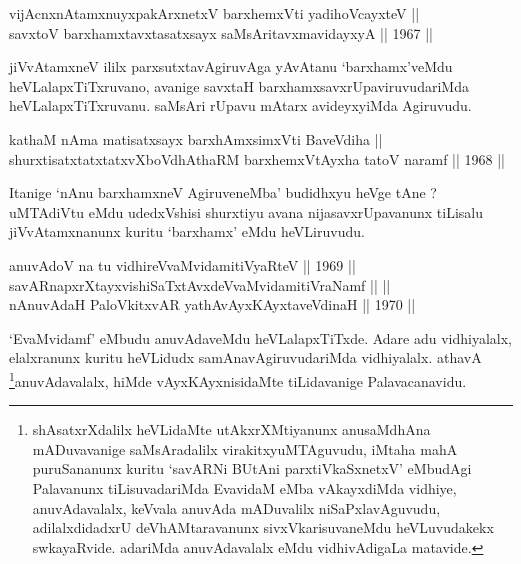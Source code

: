 
\begin{shl}
vijAcnxnAtamxnuyxpakArxnetxV barxhemxVti yadihoVcayxteV || \\
savxtoV barxhamxtavxtasatxsayx saMsAritavxmavidayxyA \hfill || 1967 ||
  
\end{shl}

\begin{artha}
jiVvAtamxneV ililx parxsutxtavAgiruvAga yAvAtanu `barxhamx'veMdu
heVLalapxTiTxruvano, avanige savxtaH barxhamxsavxrUpaviruvudariMda
heVLalapxTiTxruvanu. saMsAri rUpavu mAtarx avideyxyiMda Agiruvudu.
\end{artha}


\begin{shl}
kathaM nAma matisatxsayx barxhAmxsimxVti BaveVdiha || \\
shurxtisatxtatxtatxvXboVdhAthaRM barxhemxVtAyxha tatoV naramf \hfill || 1968 ||
  
\end{shl}

\begin{artha}
Itanige `nAnu barxhamxneV AgiruveneMba' budidhxyu heVge tAne ?
uMTAdiVtu eMdu udedxVshisi shurxtiyu avana nijasavxrUpavanunx tiLisalu
jiVvAtamxnanunx kuritu `barxhamx' eMdu heVLiruvudu.
\end{artha}


\begin{shl}
anuvAdoV na tu vidhireVvaMvidamitiVyaRteV \hfill || 1969 ||\\
\footnotemark[1]savARnapxrXtayxvishiSaTxtAvxdeVvaMvidamitiVraNamf ||  || \\
nAnuvAdaH PaloVkitxvAR yathAvAyxKAyxtaveVdinaH \hfill || 1970 ||
  
\end{shl}

\begin{artha}
`EvaMvidamf' eMbudu anuvAdaveMdu heVLalapxTiTxde. Adare
adu vidhiyalalx, elalxranunx kuritu heVLidudx samAnavAgiruvudariMda
vidhiyalalx. athavA \footnote[2]{shAsatxrXdalilx heVLidaMte
utAkxrXMtiyanunx anusaMdhAna mADuvavanige saMsAradalilx
virakitxyuMTAguvudu, iMtaha mahA puruSananunx kuritu `savARNi BUtAni parxtiVkaSxnetxV'
eMbudAgi Palavanunx tiLisuvadariMda EvavidaM eMba vAkayxdiMda
vidhiye, anuvAdavalalx, keVvala anuvAda mADuvalilx
niSaPxlavAguvudu, adilalxdidadxrU deVhAMtaravanunx
sivxVkarisuvaneMdu heVLuvudakekx swkayaRvide. adariMda anuvAdavalalx
eMdu vidhivAdigaLa matavide.}anuvAdavalalx, hiMde
vAyxKAyxnisidaMte tiLidavanige Palavacanavidu.
\end{artha}

